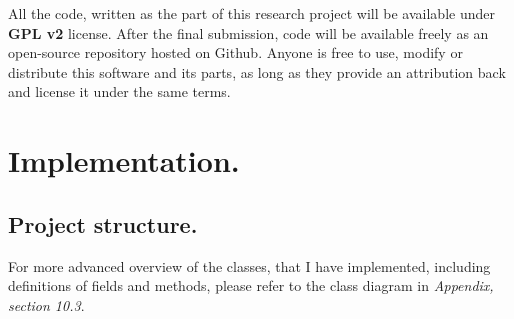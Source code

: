 \documentclass[a4paper,11pt,oneside]{article}
\begin{document}
All the code, written as the part of this research project will be available under \textbf{GPL v2} license. After the final submission, code will be available freely as an open-source repository hosted on Github. Anyone is free to use, modify or distribute this software and its parts, as long as they provide an attribution back and license it under the same terms.

\section{Implementation.}

\subsection{Project structure.}

For more advanced overview of the classes, that I have implemented, including definitions of fields and methods, please refer to the class diagram in \textit{Appendix, section 10.3}.\\
\end{document}
